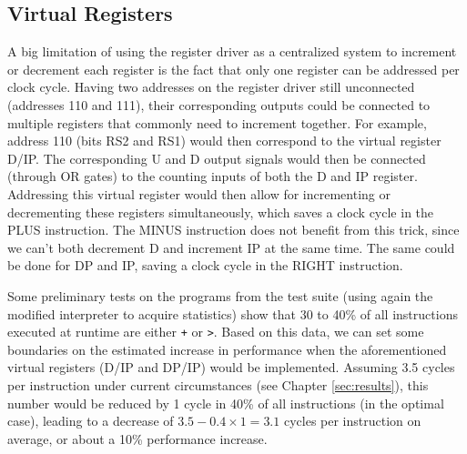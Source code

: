 \subsection{Virtual Registers} A big limitation of using the register driver as a centralized system to increment or decrement each register is the fact that only one register can be addressed per clock cycle. Having two addresses on the register driver still unconnected (addresses 110 and 111), their corresponding outputs could be connected to multiple registers that commonly need to increment together. For example, address 110 (bits RS2 and RS1) would then correspond to the virtual register D/IP. The corresponding U and D output signals would then be connected (through OR gates) to the counting inputs of both the D and IP register. Addressing this virtual register would then allow for incrementing or decrementing these registers simultaneously, which saves a clock cycle in the PLUS instruction. The MINUS instruction does not benefit from this trick, since we can't both decrement D and increment IP at the same time. The same could be done for DP and IP, saving a clock cycle in the RIGHT instruction.

Some preliminary tests on the programs from the test suite (using again the modified interpreter to acquire statistics) show that 30 to 40\% of all instructions executed at runtime are either \texttt{+} or \texttt{>}. Based on this data, we can set some boundaries on the estimated increase in performance when the aforementioned virtual registers (D/IP and DP/IP) would be implemented. Assuming 3.5 cycles per instruction under current circumstances (see Chapter \ref{sec:results}), this number would be reduced by 1 cycle in 40\% of all instructions (in the optimal case), leading to a decrease of $3.5 - 0.4\times 1 = 3.1$ cycles per instruction on average, or about a 10\% performance increase.

